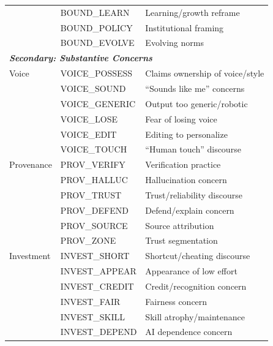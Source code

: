 \documentclass[11pt]{article}
\begin{document}
\begin{longtable}{@{}p{3cm}p{3cm}p{8.5cm}@{}}
& BOUND\_LEARN & Learning/growth reframe \\
\rowcolor{boundarycolor!20}
& BOUND\_POLICY & Institutional framing \\
\rowcolor{boundarycolor!20}
& BOUND\_EVOLVE & Evolving norms \\
\midrule
\multicolumn{3}{l}{\textbf{\textit{Secondary: Substantive Concerns}}} \\
\midrule
\rowcolor{voicecolor!20}
Voice & VOICE\_POSSESS & Claims ownership of voice/style \\
\rowcolor{voicecolor!20}
& VOICE\_SOUND & ``Sounds like me'' concerns \\
\rowcolor{voicecolor!20}
& VOICE\_GENERIC & Output too generic/robotic \\
\rowcolor{voicecolor!20}
& VOICE\_LOSE & Fear of losing voice \\
\rowcolor{voicecolor!20}
& VOICE\_EDIT & Editing to personalize \\
\rowcolor{voicecolor!20}
& VOICE\_TOUCH & ``Human touch'' discourse \\
\midrule
\rowcolor{provcolor!20}
Provenance & PROV\_VERIFY & Verification practice \\
\rowcolor{provcolor!20}
& PROV\_HALLUC & Hallucination concern \\
\rowcolor{provcolor!20}
& PROV\_TRUST & Trust/reliability discourse \\
\rowcolor{provcolor!20}
& PROV\_DEFEND & Defend/explain concern \\
\rowcolor{provcolor!20}
& PROV\_SOURCE & Source attribution \\
\rowcolor{provcolor!20}
& PROV\_ZONE & Trust segmentation \\
\midrule
\rowcolor{investcolor!20}
Investment & INVEST\_SHORT & Shortcut/cheating discourse \\
\rowcolor{investcolor!20}
& INVEST\_APPEAR & Appearance of low effort \\
\rowcolor{investcolor!20}
& INVEST\_CREDIT & Credit/recognition concern \\
\rowcolor{investcolor!20}
& INVEST\_FAIR & Fairness concern \\
\rowcolor{investcolor!20}
& INVEST\_SKILL & Skill atrophy/maintenance \\
\rowcolor{investcolor!20}
& INVEST\_DEPEND & AI dependence concern \\

\end{longtable}
\end{document}

